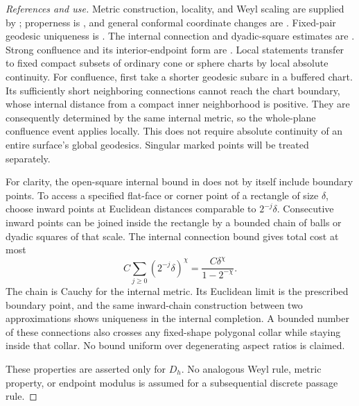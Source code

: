 \begin{proof}[References and use]
Metric construction, locality, and Weyl scaling are supplied by \cite{GwynneMillerMetric}; properness is \cite[Lemma~3.8]{DFGPSWeakMetric}, and general conformal coordinate changes are \cite[Theorem~1.3]{GwynneMillerConformal}. Fixed-pair geodesic uniqueness is \cite[Theorem~1.2]{MillerQianGeodesics}. The internal connection and dyadic-square estimates are \cite[Lemma~3.20, Equations~(3.66)--(3.67)]{DFGPSWeakMetric}. Strong confluence and its interior-endpoint form are \cite[Theorem~2 and Proposition~6]{BhatiaKavvadiasConfluence}. Local statements transfer to fixed compact subsets of ordinary cone or sphere charts by local absolute continuity. For confluence, first take a shorter geodesic subarc in a buffered chart. Its sufficiently short neighboring connections cannot reach the chart boundary, whose internal distance from a compact inner neighborhood is positive. They are consequently determined by the same internal metric, so the whole-plane confluence event applies locally. This does not require absolute continuity of an entire surface's global geodesics. Singular marked points will be treated separately.

For clarity, the open-square internal bound in \cite[Proposition~3.10]{DFGPSWeakMetric} does not by itself include boundary points. To access a specified flat-face or corner point of a rectangle of size \(\delta\), choose inward points at Euclidean distances comparable to \(2^{-j}\delta\). Consecutive inward points can be joined inside the rectangle by a bounded chain of balls or dyadic squares of that scale. The internal connection bound gives total cost at most
\[
 C\sum_{j\ge0}(2^{-j}\delta)^\chi
 =\frac{C\delta^\chi}{1-2^{-\chi}}.
\]
The chain is Cauchy for the internal metric. Its Euclidean limit is the prescribed boundary point, and the same inward-chain construction between two approximations shows uniqueness in the internal completion. A bounded number of these connections also crosses any fixed-shape polygonal collar while staying inside that collar. No bound uniform over degenerating aspect ratios is claimed.

These properties are asserted only for \(D_h\). No analogous Weyl rule, metric property, or endpoint modulus is assumed for a subsequential discrete passage rule.
\end{proof}
